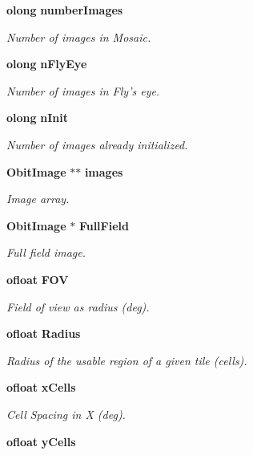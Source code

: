 \begin{CompactItemize}
{\bf olong} {\bf number\-Images}
\begin{CompactList}\small\item\em Number of images in Mosaic. \item\end{CompactList}\item 
{\bf olong} {\bf n\-Fly\-Eye}
\begin{CompactList}\small\item\em Number of images in Fly's eye. \item\end{CompactList}\item 
{\bf olong} {\bf n\-Init}
\begin{CompactList}\small\item\em Number of images already initialized. \item\end{CompactList}\item 
{\bf Obit\-Image} $\ast$$\ast$ {\bf images}
\begin{CompactList}\small\item\em Image array. \item\end{CompactList}\item 
{\bf Obit\-Image} $\ast$ {\bf Full\-Field}
\begin{CompactList}\small\item\em Full field image. \item\end{CompactList}\item 
{\bf ofloat} {\bf FOV}
\begin{CompactList}\small\item\em Field of view as radius (deg). \item\end{CompactList}\item 
{\bf ofloat} {\bf Radius}
\begin{CompactList}\small\item\em Radius of the usable region of a given tile (cells). \item\end{CompactList}\item 
{\bf ofloat} {\bf x\-Cells}
\begin{CompactList}\small\item\em Cell Spacing in X (deg). \item\end{CompactList}\item 
{\bf ofloat} {\bf y\-Cells}
$$
\end{CompactItemize}
